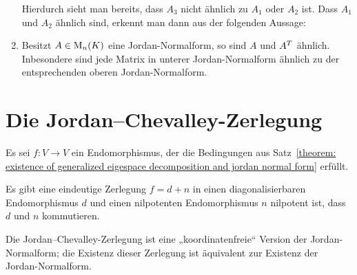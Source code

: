 \begin{example}
\begin{enumerate}
      Hierdurch sieht man bereits, dass $A_3$ nicht ähnlich zu $A_1$ oder $A_2$ ist.
      Dass $A_1$ und $A_2$ ähnlich sind, erkennt man dann aus der folgenden Aussage:
      
    \item
      Besitzt $A \in \operatorname{M}_{n}(K)$ eine Jordan-Normalform, so sind $A$ und $A^T$ ähnlich.
      Inbesondere sind jede Matrix in unterer Jordan-Normalform ähnlich zu der entsprechenden oberen Jordan-Normalform.
  \end{enumerate}
\end{example}





\section{Die Jordan--Chevalley-Zerlegung}

Es sei $f \colon V \to V$ ein Endomorphismus, der die Bedingungen aus Satz~\ref{theorem: existence of generalized eigespace decomposition and jordan normal form} erfüllt.

\begin{proposition}
  Es gibt eine eindeutige Zerlegung $f = d + n$ in einen diagonalisierbaren Endomorphismus $d$ und einen nilpotenten Endomorphismus $n$ nilpotent ist, dass $d$ und $n$ kommutieren.
\end{proposition}

Die Jordan--Chevalley-Zerlegung ist eine „koordinatenfreie“ Version der Jordan-Normalform;
die Existenz dieser Zerlegung ist äquivalent zur Existenz der Jordan-Normalform.


